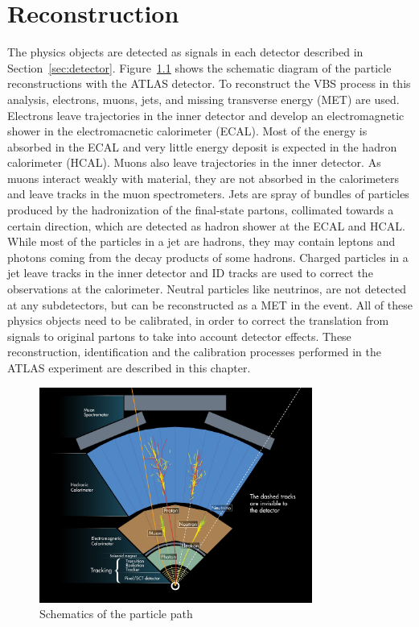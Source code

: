 \chapter{Reconstruction}
\label{chap:reconstruction}
The physics objects are detected as signals in each detector described in Section~\ref{sec:detector}.
Figure~\ref{fig:ParticlePath} shows the schematic diagram of the particle reconstructions with the ATLAS detector. 
To reconstruct the VBS process in this analysis, electrons, muons, jets, and missing transverse energy (MET) are used.
Electrons leave trajectories in the inner detector and develop an electromagnetic shower in the electromacnetic calorimeter (ECAL). 
Most of the energy is absorbed in the ECAL and very little energy deposit is expected in the hadron calorimeter (HCAL).
Muons also leave trajectories in the inner detector.
As muons interact weakly with material, they are not absorbed in the calorimeters and leave tracks in the muon spectrometers.
Jets are spray of bundles of particles produced by the hadronization of the final-state partons, collimated towards a certain direction, which are detected as hadron shower at the ECAL and HCAL. While most of the particles in a jet are hadrons, they may contain leptons and photons coming from the decay products of some hadrons. 
Charged particles in a jet leave tracks in the inner detector and ID tracks are used to correct the observations at the calorimeter. Neutral particles like neutrinos, are not detected at any subdetectors, but can be reconstructed as a MET in the event.
All of these physics objects need to be calibrated, in order to correct the translation from signals to original partons to take into account detector effects.
These reconstruction, identification and the calibration processes performed in the ATLAS experiment are described in this chapter.

\begin{figure}[tbp]
\begin{center}
 \includegraphics[width=0.80\textwidth,keepaspectratio]{figures/Reconstruction/ParticlePath}
\caption{
Schematics of the particle path
}
\label{fig:ParticlePath}
\end{center}
\end{figure}
